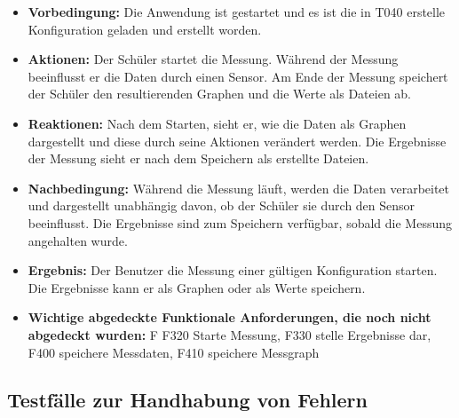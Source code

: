 \documentclass[parskip=full]{scrartcl}
\begin{document}
\begin{itemize}
\begin{itemize}
\item []\textbf{Vorbedingung:} Die Anwendung ist gestartet und es ist die in T040 erstelle Konfiguration geladen und erstellt worden.

\item []\textbf{Aktionen:} Der Schüler startet die Messung. Während der Messung beeinflusst er die Daten durch einen Sensor. Am Ende der Messung speichert der Schüler den resultierenden Graphen und die Werte als Dateien ab.
\item []\textbf{Reaktionen:} Nach dem Starten, sieht er, wie die Daten als Graphen dargestellt und diese durch seine Aktionen verändert werden. Die Ergebnisse der Messung sieht er nach dem Speichern als erstellte Dateien.
\item []\textbf{Nachbedingung:} Während die Messung läuft, werden die Daten verarbeitet und dargestellt unabhängig davon, ob der Schüler sie durch den Sensor beeinflusst. Die Ergebnisse sind zum Speichern verfügbar, sobald die Messung angehalten wurde.


\item []\textbf{Ergebnis:} Der Benutzer die Messung einer gültigen Konfiguration starten. Die Ergebnisse kann er als Graphen oder als Werte speichern. 
\item []\textbf{Wichtige abgedeckte Funktionale Anforderungen, die noch nicht abgedeckt wurden:} F F320 Starte Messung, F330 stelle Ergebnisse dar, F400 speichere Messdaten, F410 speichere Messgraph


\end{itemize}
\end{itemize}

\subsection{Testfälle zur Handhabung von Fehlern}
\end{document}
